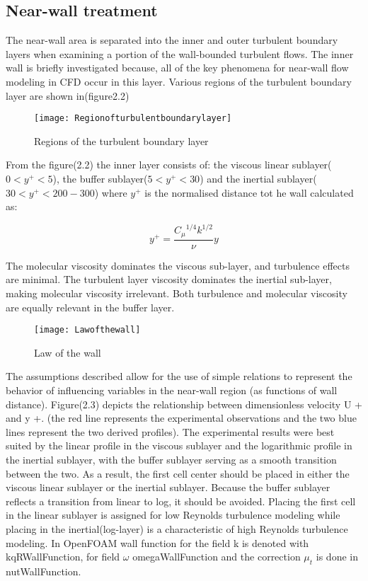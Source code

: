 \subsection{Near-wall treatment}
The near-wall area is separated into the inner and outer turbulent
boundary layers when examining a portion of the wall-bounded turbulent
flows. The inner wall is briefly investigated because, all of the key
phenomena for near-wall flow modeling in CFD occur in this
layer. Various regions of the turbulent boundary layer are shown
in(figure2.2)

\begin{figure}[H]
 \centering
 \texttt{[image: Regionofturbulentboundarylayer]}
 \caption{Regions of the turbulent boundary layer}
 \label{fig:fig14}
\end{figure}

From the figure(2.2) the inner layer consists of: the viscous linear
sublayer($0<{y^+}<5$), the buffer sublayer($5<{y^+}<30$) and the
inertial sublayer($30<{y^+}<200-300$) where ${y^+}$ is the normalised
distance tot he wall calculated as:

\begin{equation}
{y^+}={\frac{{{C_{\mu}}^{1/4}}{k^{1/2}}}{\nu}}y
\end{equation}

The molecular viscosity dominates the viscous sub-layer, and
turbulence effects are minimal. The turbulent layer viscosity
dominates the inertial sub-layer, making molecular viscosity
irrelevant.  Both turbulence and molecular viscosity are equally
relevant in the buffer layer. \\

\begin{figure}[H]
 \centering
 \texttt{[image: Lawofthewall]}
 \caption{Law of the wall}
 \label{fig:fig15}
\end{figure}

The assumptions described allow for the use of simple relations to
represent the behavior of influencing variables in the near-wall
region (as functions of wall distance).  Figure(2.3) depicts the
relationship between dimensionless velocity U + and y +. (the red line
represents the experimental observations and the two blue lines
represent the two derived profiles).  The experimental results were
best suited by the linear profile in the viscous sublayer and the
logarithmic profile in the inertial sublayer, with the buffer sublayer
serving as a smooth transition between the two.  As a result, the
first cell center should be placed in either the viscous linear
sublayer or the inertial sublayer. Because the buffer sublayer
reflects a transition from linear to log, it should be avoided.
Placing the first cell in the linear sublayer is assigned for low
Reynolds turbulence modeling while placing in the inertial(log-layer)
is a characteristic of high Reynolds turbulence modeling. In OpenFOAM
wall function for the field k is denoted with kqRWallFunction, for
field $\omega$ omegaWallFunction and the correction ${\mu}_t$ is done
in nutWallFunction.

